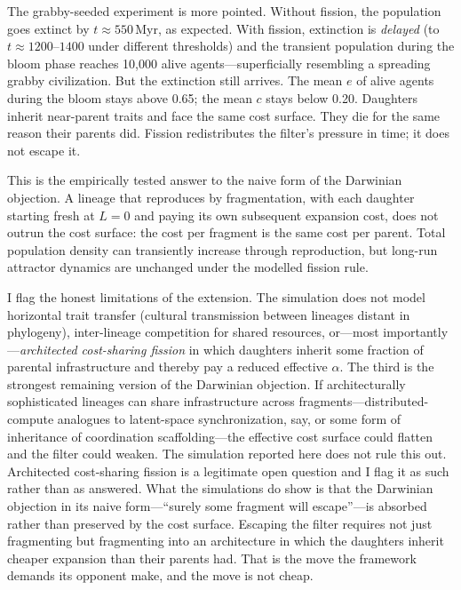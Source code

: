 \documentclass[11pt,a4paper,twocolumn]{article}
\begin{document}
The grabby-seeded experiment is more pointed. Without fission, the
population goes extinct by $t \approx 550$\,Myr, as expected. With
fission, extinction is \emph{delayed} (to $t \approx 1200$--$1400$
under different thresholds) and the transient population during
the bloom phase reaches 10{,}000 alive agents---superficially
resembling a spreading grabby civilization. But the extinction
still arrives. The mean $e$ of alive agents during the bloom stays
above 0.65; the mean $c$ stays below 0.20. Daughters inherit
near-parent traits and face the same cost surface. They die for
the same reason their parents did. Fission redistributes the
filter's pressure in time; it does not escape it.

This is the empirically tested answer to the naive form of the
Darwinian objection. A lineage that reproduces by fragmentation, with
each daughter starting fresh at $L=0$ and paying its own subsequent
expansion cost, does not outrun the cost surface: the cost per
fragment is the same cost per parent. Total population density can
transiently increase through reproduction, but long-run attractor
dynamics are unchanged under the modelled fission rule.

I flag the honest limitations of the extension. The simulation does
not model horizontal trait transfer (cultural transmission between
lineages distant in phylogeny), inter-lineage competition for shared
resources, or---most importantly---\emph{architected cost-sharing
fission} in which daughters inherit some fraction of parental
infrastructure and thereby pay a reduced effective $\alpha$. The
third is the strongest remaining version of the Darwinian objection.
If architecturally sophisticated lineages can share infrastructure
across fragments---distributed-compute analogues to latent-space
synchronization, say, or some form of inheritance of coordination
scaffolding---the effective cost surface could flatten and the filter
could weaken. The simulation reported here does not rule this out.
Architected cost-sharing fission is a legitimate open question and I
flag it as such rather than as answered. What the simulations do show
is that the Darwinian objection in its naive form---``surely some
fragment will escape''---is absorbed rather than preserved by the
cost surface. Escaping the filter requires not just fragmenting but
fragmenting into an architecture in which the daughters inherit
cheaper expansion than their parents had. That is the move the
framework demands its opponent make, and the move is not cheap.
\end{document}

